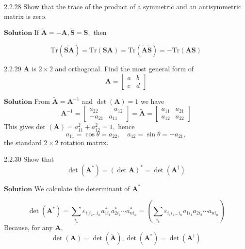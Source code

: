 \documentclass{article}
\begin{document}
\begin{flushleft}
\newpage





\begin{mybox}{2.2.28}
Show that the trace of the product of a symmetric and an antisymmetric matrix is zero.
\end{mybox}


$\boxed{\textbf{Solution}}$  
If $\tilde{\mathbf{A}}=-\mathbf{A}, \tilde{\mathbf{S}}=\mathbf{S},$ then

$$\text{Tr}(\widetilde{\mathbf{SA}})=\text{Tr}(\mathbf{SA})=\text{Tr}(\tilde{\mathbf{A}} \tilde{\mathbf{S}})=-\text{Tr}(\mathbf{AS})$$



\newpage


\begin{mybox}{2.2.29}
$\mathbf{A}$ is $2 \times 2$ and orthogonal. Find the most general form of
$$
\mathbf{A}=\begin{bmatrix}{a} & {b} \\ {c} & {d}\end{bmatrix}
$$
\end{mybox}

$\boxed{\textbf{Solution}}$  From $\tilde{\mathbf{A}}=\mathbf{A}^{-1}$ and $\operatorname{det}(\mathbf{A})=1$ we have
$$
\mathbf{A}^{-1}=\begin{bmatrix}{a_{22}} & {-a_{12}} \\ {-a_{21}} & {a_{11}}\end{bmatrix}=\tilde{\mathbf{A}}=\begin{bmatrix}{a_{11}} & {a_{21}} \\ {a_{12}} & {a_{22}}\end{bmatrix}
$$
This gives det $(\mathbf{A})=a_{11}^{2}+a_{12}^{2}=1,$ hence 
$$a_{11}=\cos \theta=a_{22},\quad  a_{12}=\sin \theta=-a_{21},$$
the standard $2 \times 2$ rotation matrix.



\newpage




\begin{mybox}{2.2.30}
Show that
$$
\operatorname{det}\left(\mathbf{A}^{*}\right)=(\operatorname{det} \mathbf{A})^{*}=\operatorname{det}\left(\mathbf{A}^{\dagger}\right)
$$
\end{mybox}


$\boxed{\textbf{Solution}}$  We calculate the determinant of $\mathbf{A}^{*}$

$$\operatorname{det}\left(\mathbf{A}^{*}\right)=\sum_{i_{k}} \varepsilon_{i_{1} i_{2} \ldots i_{n}} a_{1 i_{1}}^{*} a_{2 i_{2}}^{*} \cdots a_{n i_{n}}^{*}=\left(\sum_{i_{k}} \varepsilon_{i_{1} i_{2} \ldots i_{n}} a_{1 i_{1}} a_{2 i_{2}} \cdots a_{n i_{n}}\right)$$
Because, for any $\mathbf{A},$ 
$$\operatorname{det}(\mathbf{A})=\operatorname{det}(\tilde{\mathbf{A}}), \operatorname{det}\left(\mathbf{A}^{*}\right)=\operatorname{det}\left(\mathbf{A}^{\dagger}\right)$$



\end{flushleft}
\end{document}
